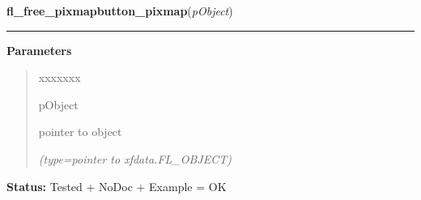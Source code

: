     \label{xformslib:library:fl_free_pixmap_pixmap}

    \vspace{0.5ex}

\hspace{.8\funcindent}\begin{boxedminipage}{\funcwidth}

    \raggedright \textbf{fl\_free\_pixmapbutton\_pixmap}(\textit{pObject})

    \vspace{-1.5ex}

    \rule{\textwidth}{0.5\fboxrule}
\setlength{\parskip}{2ex}
\setlength{\parskip}{1ex}
      \textbf{Parameters}
      \vspace{-1ex}

      \begin{quote}
        \begin{Ventry}{xxxxxxx}

          \item[pObject]

          pointer to object

            {\it (type=pointer to xfdata.FL\_OBJECT)}

        \end{Ventry}

      \end{quote}

\textbf{Status:} Tested + NoDoc + Example = OK



    \end{boxedminipage}

    \label{xformslib:library:fl_get_pixmap_pixmap}

    \vspace{0.5ex}

